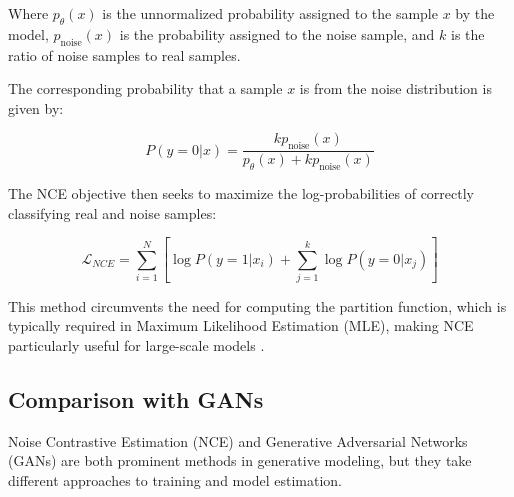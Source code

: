 Where \( p_{\theta}(x) \) is the unnormalized probability assigned to the sample \( x \) by the model, \( p_{\text{noise}}(x) \) is the probability assigned to the noise sample, and \( k \) is the ratio of noise samples to real samples.

The corresponding probability that a sample \( x \) is from the noise distribution is given by:

\begin{equation}
P(y = 0 | x) = \frac{k p_{\text{noise}}(x)}{p_{\theta}(x) + k p_{\text{noise}}(x)}
\end{equation}

The NCE objective then seeks to maximize the log-probabilities of correctly classifying real and noise samples:

\begin{equation}
\mathcal{L}_{NCE} = \sum_{i=1}^{N} \left[ \log P(y=1 | x_i) + \sum_{j=1}^{k} \log P(y=0 | x_j) \right]
\end{equation}

This method circumvents the need for computing the partition function, which is typically required in Maximum Likelihood Estimation (MLE), making NCE particularly useful for large-scale models \citep{10.48550/arxiv.2110.11271}.
\subsection{Comparison with GANs}

Noise Contrastive Estimation (NCE) and Generative Adversarial Networks (GANs) are both prominent methods in generative modeling, but they take different approaches to training and model estimation.


